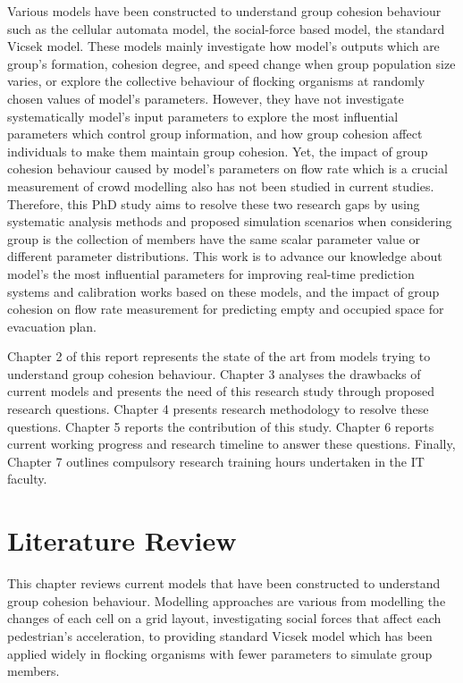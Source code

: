 \documentclass[a4paper,11pt,phdthesis,singlespace,twoside]{cssethesis}
\begin{document}
Various models have been constructed to understand group cohesion behaviour such as the cellular automata model, the social-force based model, the standard Vicsek model. These models mainly investigate how model’s outputs which are group’s formation, cohesion degree, and speed change when group population size varies, or explore the collective behaviour of flocking organisms at randomly chosen values of model’s parameters. However, they have not investigate systematically model’s input parameters to explore the most influential parameters which control group information, and how group cohesion affect individuals to make them maintain group cohesion. Yet, the impact of group cohesion behaviour caused by model’s parameters on flow rate which is a crucial measurement of crowd modelling also has not been studied in current studies. Therefore, this PhD study aims to resolve these two research gaps by using systematic analysis methods and proposed simulation scenarios when considering group is the collection of members have the same scalar parameter value or different parameter distributions. This work is to advance our knowledge about model’s the most influential parameters for improving real-time prediction systems and calibration works based on these models, and the impact of group cohesion on flow rate measurement for predicting empty and occupied space for evacuation plan.

Chapter 2 of this report represents the state of the art from models trying to understand group cohesion behaviour. Chapter 3 analyses the drawbacks of current models and presents the need of this research study through proposed research questions. Chapter 4 presents research methodology to resolve these questions. Chapter 5 reports the contribution of this study. Chapter 6 reports current working progress and research timeline to answer these questions. Finally, Chapter 7 outlines compulsory research training hours undertaken in the IT faculty.

\chapter{Literature Review}
\let\cleardoublepage\clearpage
This chapter reviews current models that have been constructed to understand group cohesion behaviour. Modelling approaches are various from modelling the changes of each cell on a grid layout, investigating social forces that affect each pedestrian’s acceleration, to providing standard Vicsek model which has been applied widely in flocking organisms with fewer parameters to simulate group members.
\end{document}
